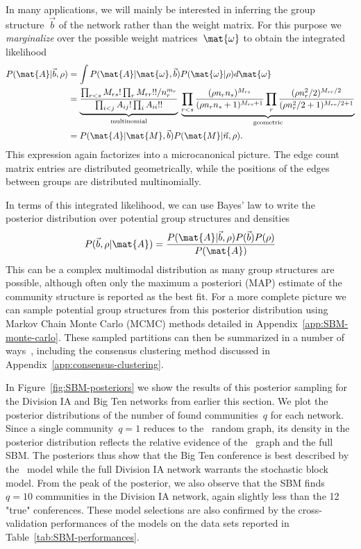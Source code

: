 In many applications, we will mainly be interested in inferring the group structure~$\vec{b}$ of the network rather than the weight matrix. For this purpose we \emph{marginalize} over the possible weight matrices~$\mat{\omega}$ to obtain the integrated likelihood \begin{align}
    P(\mat{A}|\vec{b},\rho) &= \int P(\mat{A}|\mat{\omega},\vec{b})P(\mat{\omega}|\rho) d\mat{\omega} \nonumber \\
    &= \underbrace{\frac{\prod_{r < s} M_{rs}! \prod_r M_{rr}!!/n_r^{m_r}}{\prod_{i<j}A_{ij}!\prod_i A_{ii}!!}}_{\text{multinomial}} \> \underbrace{\prod_{r < s} \frac{(\rho n_r n_s)^{M_{rs}}}{(\rho n_r n_s + 1)^{M_{rs} + 1}}\prod_r \frac{(\rho n_r^2/2)^{M_{rr}/2}}{(\rho n_r^2/2 + 1)^{M_{rr}/2 + 1}}}_{\text{geometric}} \nonumber \\
    &= P(\mat{A}|\mat{M},\vec{b})P(\mat{M}|\vec{n},\rho). \label{eq:P-A-given-b-rho}
\end{align}
This expression again factorizes into a microcanonical picture. The edge count matrix entries are distributed geometrically, while the positions of the edges between groups are distributed multinomially. 

In terms of this integrated likelihood, we can use Bayes' law to write the posterior distribution over potential group structures and densities \begin{align}
    P(\vec{b},\rho|\mat{A}) = \frac{P(\mat{A}|\vec{b},\rho)P(\vec{b})P(\rho)}{P(\mat{A})}
\end{align}
This can be a complex multimodal distribution as many group structures are possible, although often only the maximum a posteriori (MAP) estimate of the community structure is reported as the best fit. For a more complete picture we can sample potential group structures from this posterior distribution using Markov Chain Monte Carlo (MCMC) methods detailed in Appendix~\ref{app:SBM-monte-carlo}. These sampled partitions can then be summarized in a number of ways~\cite{LF12, KN22}, including the consensus clustering method discussed in Appendix~\ref{app:consensus-clustering}.

In Figure~\ref{fig:SBM-posteriors} we show the results of this posterior sampling for the Division IA and Big Ten networks from earlier this section. We plot the posterior distributions of the number of found communities~$q$ for each network. Since a single community~$q = 1$ reduces to the \ER~random graph, its density in the posterior distribution reflects the relative evidence of the \ER~graph and the full SBM. The posteriors thus show that the Big Ten conference is best described by the \ER~model while the full Division IA network warrants the stochastic block model. From the peak of the posterior, we also observe that the SBM finds~$q = 10$ communities in the Division IA network, again slightly less than the 12 "true" conferences. These model selections are also confirmed by the cross-validation performances of the models on the data sets reported in Table~\ref{tab:SBM-performances}.

